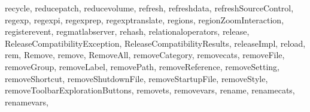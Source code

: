 {{        recycle,%
        reducepatch,%
        reducevolume,%
        refresh,%
        refreshdata,%
        refreshSourceControl,%
        regexp,%
        regexpi,%
        regexprep,%
        regexptranslate,%
        regions,%
        regionZoomInteraction,%
        registerevent,%
        regmatlabserver,%
        rehash,%
        relationaloperators,%
        release,%
        ReleaseCompatibilityException,%
        ReleaseCompatibilityResults,%
        releaseImpl,%
        reload,%
        rem,%
        Remove,%
        remove,%
        RemoveAll,%
        removeCategory,%
        removecats,%
        removeFile,%
        removeGroup,%
        removeLabel,%
        removePath,%
        removeReference,%
        removeSetting,%
        removeShortcut,%
        removeShutdownFile,%
        removeStartupFile,%
        removeStyle,%
        removeToolbarExplorationButtons,%
        removets,%
        removevars,%
        rename,%
        renamecats,%
        renamevars,%
}}
